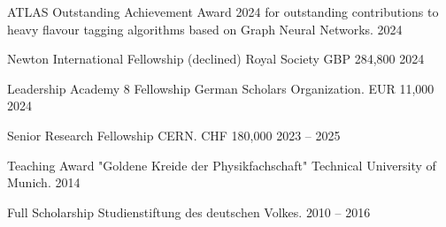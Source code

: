 

\begin{cvhonors}

  \cvhonor
    {ATLAS Outstanding Achievement Award 2024} %
    {for outstanding contributions to heavy flavour tagging algorithms based on
    Graph Neural Networks.} %
    {} %
    {2024} %

  \cvhonor
    {Newton International Fellowship (declined)} %
    {Royal Society} %
    {GBP  284,800} %
    {2024} %

  \cvhonor
    {Leadership Academy 8 Fellowship} %
    {German Scholars Organization.} %
    {EUR 11,000} %
    {2024} %


  \cvhonor
    {Senior Research Fellowship} %
    {CERN.} %
    {CHF 180,000} %
    {2023 -- 2025} %

  \cvhonor
    {Teaching Award "Goldene Kreide der Physikfachschaft"} %
    {Technical University of Munich.} %
    {} %
    {2014} %

  \cvhonor
    {Full Scholarship} %
    {Studienstiftung des deutschen Volkes.} %
    {} %
    {2010 -- 2016} %

\end{cvhonors}
